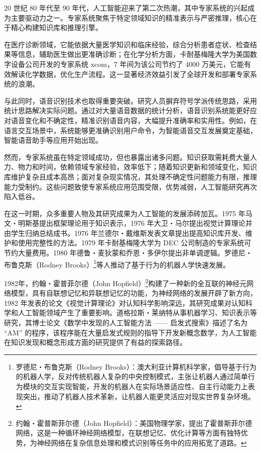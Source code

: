 20 世纪 80 年代至 90 年代，人工智能迎来了第二次热潮，其中专家系统的兴起成为主要驱动力之一。专家系统聚焦于特定领域知识的精准表示与严密推理，核心在于精心构建知识库和推理引擎。


在医疗诊断领域，它能依据大量医学知识和临床经验，综合分析患者症状、检查结果等信息，辅助医生做出更准确诊断；在化学分析方面，卡耐基梅隆大学为美国数字设备公司开发的专家系统 xcom，7 年间为该公司节约了 4000 万美元，它能有效解读化学数据，优化生产流程。这一显著经济效益引发了全球开发和部署专家系统的浪潮。


与此同时，语音识别技术也取得重要突破。研究人员摒弃符号学派传统思路，采用统计思路解决实际问题。通过对大量语音数据的统计分析，语音识别系统能更好应对语音变化和不确定性，精准识别语音内容，大幅提升准确率和实用性。例如，在语言交互场景中，系统能够更准确识别用户命令，为智能语音交互发展奠定基础，智能语音助手等应用开始出现。


然而，专家系统虽在特定领域成功，但也暴露出诸多问题。知识获取需耗费大量人力、物力和时间，依赖领域专家经验，效率低下；随着知识更新和领域变化，知识库维护复杂且成本高昂；面对复杂现实情况，其处理不确定性问题能力有限，推理能力受制约。这些问题致使专家系统应用范围受限，优势减弱，人工智能研究再次陷入低谷。


在这一时期，众多重要人物及其研究成果为人工智能的发展添砖加瓦。1975 年马文・明斯基提出框架理论用于知识表示，1976 年大卫・马尔提出视觉计算理论并由学生归纳总结成书。1976 年兰德尔・戴维斯发表文章提出提高知识库开发、维护和使用完整性的方法。1979 年卡耐基梅隆大学为 DEC 公司制造的专家系统可节约大量费用。1980 年德鲁・麦狄蒙和乔恩・多伊尔提出非单调逻辑。罗德尼・布鲁克斯（Rodney Brooks）\footnote{罗德尼・布鲁克斯（Rodney Brooks）：澳大利亚计算机科学家，倡导基于行为的机器人学，反对传统机器人复杂的中央控制模式，主张让机器人通过简单行为模块的交互实现智能，开发的机器人在实际场景适应性、自主行动能力上表现突出，推动了机器人技术革新，让机器人能更灵活应对现实世界复杂环境。}等人推动了基于行为的机器人学快速发展。


1982年，约翰・霍普菲尔德（John Hopfield）\footnote{约翰・霍普斯菲尔德（John Hopfield）：美国物理学家，提出了霍普斯菲尔德网络，这是一种循环神经网络模型，在联想记忆、优化计算等方面有独特优势，为神经网络在复杂信息处理和模式识别等任务中的应用拓宽了道路。}构建了一种新的全互联的神经元网络模型，具有自联想记忆和异联想记忆的功能，为神经网络的发展开辟了新方向， 1982 年发表的论文《视觉计算理论》对认知科学影响深远，其研究成果对认知科学和人工智能领域产生了重要影响。道格拉斯・莱纳特从事机器学习、知识表示等研究，其博士论文《数学中发现的人工智能方法 —— 启发式搜索》描述了名为 “AM” 的程序，该程序能在大量启发式规则的指导下开发新概念数学，为人工智能在知识发现和概念形成方面的研究提供了有益的探索路径。


